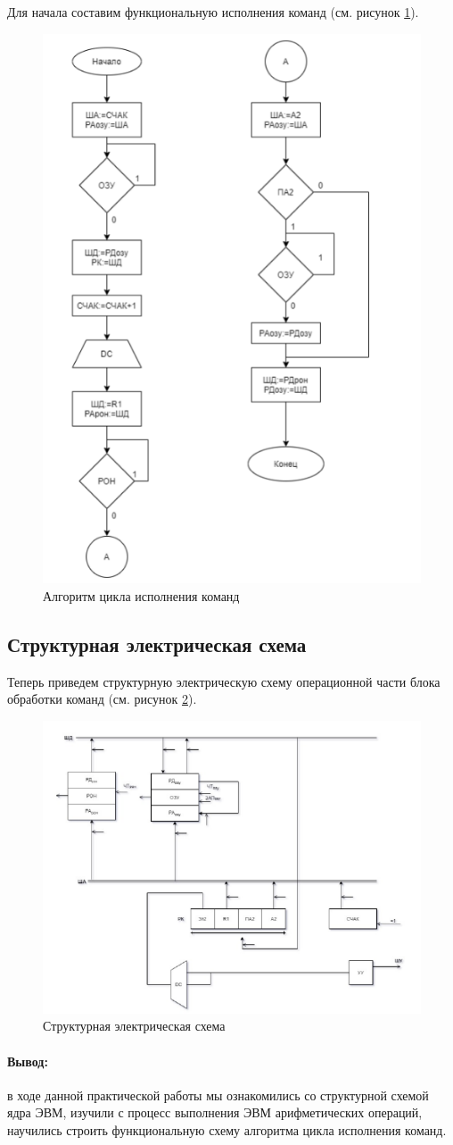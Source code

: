 \documentclass[a4paper,14pt]{extarticle}
\begin{document}
Для
начала
составим
функциональную
исполнения команд (см. рисунок \ref{fig:algorithm-pr-2}).

\begin{figure}[h!]
	\centering
	\includegraphics[width=0.5\linewidth]{images/algorithm-pr-2}
	\caption{Алгоритм цикла исполнения команд}
	\label{fig:algorithm-pr-2}
\end{figure}
\subsection*{Структурная электрическая схема}

Теперь приведем структурную электрическую схему операционной
части блока обработки команд (см. рисунок \ref{fig:struct-scheme}).

\begin{figure}[h!]
	\centering
	\includegraphics[width=0.6\linewidth]{images/struct-scheme}
	\caption{Структурная электрическая схема}
	\label{fig:struct-scheme}
\end{figure}


\newpage
\paragraph{Вывод:}

в ходе данной практической работы мы ознакомились со структурной
схемой ядра ЭВМ, изучили с процесс выполнения ЭВМ арифметических
операций, научились строить функциональную схему алгоритма цикла
исполнения команд.
\end{document}
